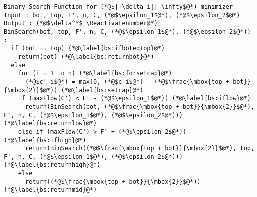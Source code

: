 \Suppressnumber
\begin{lstlisting}[label=binsearch, style=numbers]
Binary Search Function for (*@$||\delta_i||_\infty$@*) minimizer
Input : bot, top, F', n, C, (*@$\epsilon_1$@*), (*@$\epsilon_2$@*)
Output : (*@$\delta^*$ \Reactivatenumber@*)
BinSearch(bot, top, F', n, C, (*@$\epsilon_1$@*), (*@$\epsilon_2$@*)) :
  if (bot == top) (*@\label{bs:ifboteqtop}@*)
    return(bot) (*@\label{bs:returnbot}@*)
  else
    for (i = 1 to n) (*@\label{bs:forsetcap}@*)
      (*@$c'_i$@*) = max(0, (*@$c_i$@*) - (*@$\frac{\mbox{top + bot}}{\mbox{2}}$@*)) (*@\label{bs:setcap}@*)
    if (maxFlow(C') < F' - (*@$\epsilon_1$@*)) (*@\label{bs:iflow}@*)
      return(BinSearch(bot, (*@$\frac{\mbox{top + bot}}{\mbox{2}}$@*), F', n, C, (*@$\epsilon_1$@*), (*@$\epsilon_2$@*))) (*@\label{bs:returnlow}@*)
    else if (maxFlow(C') > F' + (*@$\epsilon_2$@*)) (*@\label{bs:ifhigh}@*)
      return(BinSearch((*@$\frac{\mbox{top + bot}}{\mbox{2}}$@*), top, F', n, C, (*@$\epsilon_1$@*), (*@$\epsilon_2$@*))) (*@\label{bs:returnhigh}@*)
    else
      return((*@$\frac{\mbox{top + bot}}{\mbox{2}}$@*)) (*@\label{bs:returnmid}@*)
\end{lstlisting}
